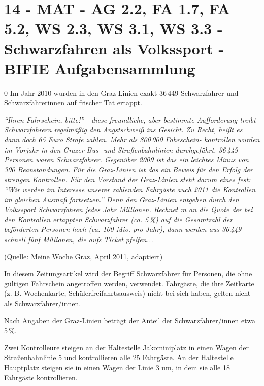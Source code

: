 \section{14 - MAT - AG 2.2, FA 1.7, FA 5.2, WS 2.3, WS 3.1, WS 3.3 - Schwarzfahren als Volkssport - BIFIE Aufgabensammlung}

\begin{langesbeispiel} \item[0] %
Im Jahr 2010 wurden in den Graz-Linien exakt 36\,449 Schwarzfahrer und Schwarzfahrerinnen auf frischer Tat ertappt.  
				
\textit{"`Ihren Fahrschein, bitte!"' - diese freundliche, aber bestimmte Aufforderung treibt Schwarzfahrern regelmäßig den Angstschweiß ins Gesicht. Zu Recht, heißt es dann doch 65 Euro Strafe zahlen. Mehr als 800\,000 Fahrschein-
kontrollen wurden im Vorjahr in den Grazer Bus- und Straßenbahnlinien durchgeführt. 36\,449 Personen waren Schwarzfahrer. Gegenüber 2009 ist das ein leichtes Minus von 300 Beanstandungen. Für die Graz-Linien ist das ein Beweis für den Erfolg der strengen Kontrollen. Für den Vorstand der Graz-Linien steht darum eines fest: "`Wir werden im Interesse unserer zahlenden Fahrgäste 
auch 2011 die Kontrollen im gleichen Ausmaß fortsetzen."' Denn den Graz-Linien entgehen durch den Volkssport Schwarzfahren jedes Jahr Millionen. Rechnet m
an die Quote der bei den Kontrollen ertappten Schwarzfahrer (ca. 5\,\%) 
auf die Gesamtzahl der beförderten Personen hoch (ca. 100 Mio. pro Jahr), dann werden aus 36\,449 schnell fünf Millionen, die aufs Ticket pfeifen...} 

\begin{footnotesize}(Quelle: Meine Woche Graz, April 2011, adaptiert)\end{footnotesize}

In diesem Zeitungsartikel wird der Begriff Schwarzfahrer für Personen, die ohne gültigen Fahrschein angetroffen werden, verwendet. Fahrgäste, die ihre Zeitkarte (z. B. Wochenkarte, Schülerfreifahrtsausweis) nicht bei sich haben,
 gelten nicht als Schwarzfahrer/innen. 

Nach Angaben der Graz-Linien beträgt der Anteil der Schwarzfahrer/innen etwa 5\,\%. 

Zwei Kontrolleure steigen an der Haltestelle Jakominiplatz in einen Wagen der Straßenbahnlinie 5 und kontrollieren alle 25 Fahrgäste. An der Haltestelle 
Hauptplatz steigen sie in einen Wagen der Linie 3 um, in dem sie alle 18 Fahrgäste kontrollieren.%


\end{langesbeispiel}
